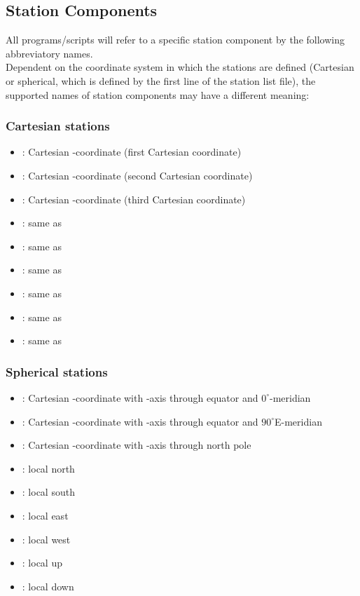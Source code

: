 \subsection*{Station Components}
%
All programs/scripts will refer to a specific station component by the following abbreviatory names.\\
Dependent on the coordinate system in which the stations are defined (Cartesian or spherical, which is 
defined by the first line of the station list file), the supported names of station components may have a 
different meaning:
\subsubsection{Cartesian stations}
\begin{itemize}
\item[] : Cartesian -coordinate (first Cartesian coordinate)
\item[] : Cartesian -coordinate (second Cartesian coordinate)
\item[] : Cartesian -coordinate (third Cartesian coordinate)
\item[] : same as 
\item[] : same as 
\item[] : same as 
\item[] : same as 
\item[] : same as 
\item[] : same as 
\end{itemize}
\subsubsection{Spherical stations}
\begin{itemize}
\item[] : Cartesian -coordinate with -axis through equator and $0^\circ$-meridian
\item[] : Cartesian -coordinate with -axis through equator and $90^\circ$E-meridian
\item[] : Cartesian -coordinate with -axis through north pole
\item[] : local north
\item[] : local south
\item[] : local east
\item[] : local west
\item[] : local up
\item[] : local down
\end{itemize}
%
